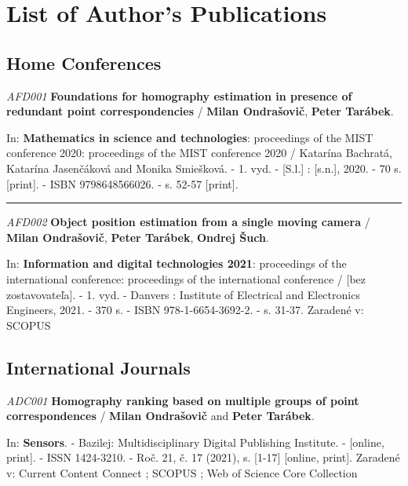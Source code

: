 \section*{List of Author's Publications}

\subsection*{Home Conferences}

\noindent \textit{AFD001} \textbf{Foundations for homography estimation in presence of redundant point correspondencies} / \textbf{Milan Ondrašovič}, \textbf{Peter Tarábek}.

\noindent In: \textbf{Mathematics in science and technologies}: proceedings of the MIST conference 2020: proceedings of the MIST conference 2020 / Katarína Bachratá, Katarína Jasenčáková and Monika Smiešková. - 1. vyd. - [S.l.] : [s.n.], 2020. - 70 s. [print]. - ISBN 9798648566026. - s. 52-57 [print].


\noindent\rule{\textwidth}{0.4pt}

\noindent \textit{AFD002} \textbf{Object position estimation from a single moving camera} /\textbf{ Milan Ondrašovič}, \textbf{Peter Tarábek}, \textbf{Ondrej Šuch}.

\noindent In: \textbf{Information and digital technologies 2021}: proceedings of the international conference: proceedings of the international conference / [bez zostavovateľa]. - 1. vyd. - Danvers : Institute of Electrical and Electronics Engineers, 2021. - 370 s. - ISBN 978-1-6654-3692-2. - s. 31-37.
Zaradené v: SCOPUS


\subsection*{International Journals}

\noindent \textit{ADC001} \textbf{Homography ranking based on multiple groups of point correspondences} / \textbf{Milan Ondrašovič} and \textbf{Peter Tarábek}.

\noindent In: \textbf{Sensors}. - Bazilej: Multidisciplinary Digital Publishing Institute. - [online, print]. - ISSN 1424-3210. - Roč. 21, č. 17 (2021), s. [1-17] [online, print].
Zaradené v: Current Content Connect ; SCOPUS ; Web of Science Core Collection

